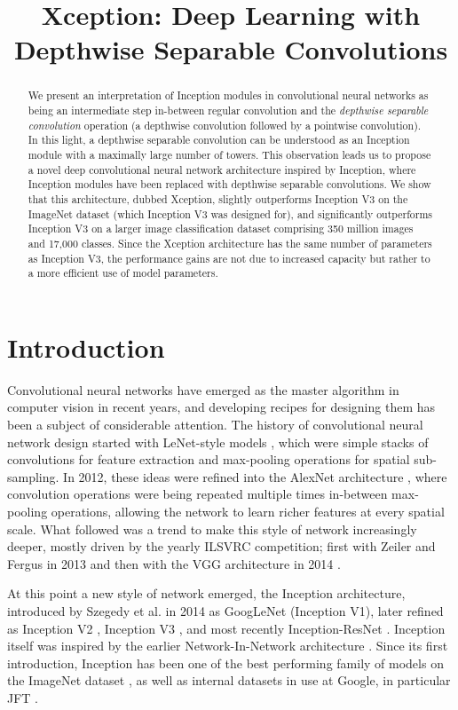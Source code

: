 \title{Xception: Deep Learning with Depthwise Separable Convolutions}

\begin{abstract}
We present an interpretation of Inception modules in convolutional neural networks as being an intermediate step in-between regular convolution and the \textit{depthwise separable convolution} operation (a depthwise convolution followed by a pointwise convolution). In this light, a depthwise separable convolution can be understood as an Inception module with a maximally large number of towers. This observation leads us to propose a novel deep convolutional neural network architecture inspired by Inception, where Inception modules have been replaced with depthwise separable convolutions. We show that this architecture, dubbed Xception, slightly outperforms Inception V3 on the ImageNet dataset (which Inception V3 was designed for), and significantly outperforms Inception V3 on a larger image classification dataset comprising 350 million images and 17,000 classes. Since the Xception architecture has the same number of parameters as Inception V3, the performance gains are not due to increased capacity but rather to a more efficient use of model parameters.
\end{abstract}

\section{Introduction}

Convolutional neural networks have emerged as the master algorithm in computer vision in recent years, and developing recipes for designing them has been a subject of considerable attention. The history of convolutional neural network design started with LeNet-style models \cite{lecun1995learning}, which were simple stacks of convolutions for feature extraction and max-pooling operations for spatial sub-sampling. In 2012, these ideas were refined into the AlexNet architecture \cite{krizhevsky2012imagenet}, where convolution operations were being repeated multiple times in-between max-pooling operations, allowing the network to learn richer features at every spatial scale. What followed was a trend to make this style of network increasingly deeper, mostly driven by the yearly ILSVRC competition; first with Zeiler and Fergus in 2013 \cite{zeiler2014visualizing} and then with the VGG architecture in 2014 \cite{simonyan2014very}.

At this point a new style of network emerged, the Inception architecture, introduced by Szegedy et al. in 2014 \cite{szegedy2015going} as GoogLeNet (Inception V1), later refined as Inception V2 \cite{ioffe2015batch}, Inception V3 \cite{szegedy2015rethinking}, and most recently Inception-ResNet \cite{inceptionResnet}. Inception itself was inspired by the earlier Network-In-Network architecture \cite{lin2013network}. Since its first introduction, Inception has been one of the best performing family of models on the ImageNet dataset \cite{russakovsky2014imagenet}, as well as internal datasets in use at Google, in particular JFT \cite{hinton15}.


